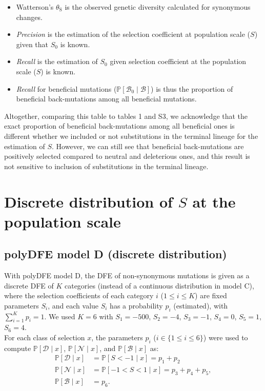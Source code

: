 \documentclass{article}
\newcommand{\proba}{\mathbb{P}}
\newcommand{\Sphy}{S_{0}}
\newcommand{\SphyBen}{\mathcal{B}_0}
\newcommand{\Sphyclass}{x}
\newcommand{\given}{\mid}
\newcommand{\Spop}{S}
\newcommand{\SpopDel}{\mathcal{D}}
\newcommand{\SpopNeu}{\mathcal{N}}
\newcommand{\SpopBen}{\mathcal{B}}
\newcommand{\thetaSyn}{\theta_{\text{S}}}
\begin{document}
    \begin{itemize}
        \item Watterson's $\thetaSyn$ is the observed genetic diversity calculated for synonymous changes.
        \item \textit{Precision} is the estimation of the selection coefficient at population scale ($\Spop$) given that $\Sphy$ is known.
        \item  \textit{Recall} is the estimation of $\Sphy$ given selection coefficient at the population scale ($\Spop$) is known.
        \item \textit{Recall} for beneficial mutations ($\proba [\SphyBen \given \SpopBen]$) is thus the proportion of beneficial back-mutations among all beneficial mutations.
    \end{itemize}

    Altogether, comparing this table to tables 1 and S3, we acknowledge that the exact proportion of beneficial back-mutations among all beneficial ones is different whether we included or not substitutions in the terminal lineage for the estimation of $\Spop$.
    However, we can still see that beneficial back-mutations are positively selected compared to neutral and deleterious ones, and this result is not sensitive to inclusion of substitutions in the terminal lineage.

    \newpage
    \section{Discrete distribution of $\Spop$ at the population scale}

    \subsection{polyDFE model D (discrete distribution)}
    With polyDFE model D, the DFE of non-synonymous mutations is given as a discrete DFE of $K$ categories (instead of a continuous distribution in model C), where the selection coefficients of each category $i$ ($1 \leq i \leq K$) are fixed parameters $\Spop_i$, and each value $\Spop_i$ has a probability $p_i$ (estimated), with $\sum_{i=1}^{K} p_i =1$.
    We used $K=6$ with $\Spop_1 = -500$, $\Spop_2 = -4$, $\Spop_3 =-1$, $\Spop_4 = 0$, $\Spop_5 = 1$, $\Spop_6 = 4$.\\
    For each class of selection $\Sphyclass$, the parameters $p_i$ ($i \in \{ 1 \leq i \leq 6 \}$) were used to compute $\proba [ \SpopDel \given  \Sphyclass] $, $\proba [ \SpopNeu \given \Sphyclass]$, and $\proba [ \SpopBen \given \Sphyclass]$ as:
    \begin{align}
        \proba [ \SpopDel \given  \Sphyclass] &= \proba [ \Spop < -1 \given \Sphyclass ] = p_1 + p_2 \label{eq:polyProbaDel} \\
        \proba [ \SpopNeu \given \Sphyclass] &= \proba [ -1 < \Spop < 1 \given \Sphyclass ] = p_3 + p_4 + p_5,  \\
        \proba [ \SpopBen \given \Sphyclass] &= p_6. \label{eq:polyProbaAdv}
    \end{align}
\end{document}

